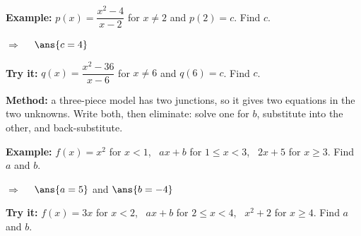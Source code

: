 \documentclass[12pt]{article}
\begin{document}
\begin{examplebox}
\textbf{Example:} \quad $p(x) = \dfrac{x^2-4}{x-2}$ for $x \neq 2$ and
$p(2) = c$. Find $c$.

$\Rightarrow\quad$ $\ans{c = 4}$
\end{examplebox}

\begin{tryitbox}
\textbf{Try it:} \quad $q(x) = \dfrac{x^2-36}{x-6}$ for $x \neq 6$ and
$q(6) = c$. Find $c$.\\[2pt]
\end{tryitbox}


\begin{formulabox}
\textbf{Method:} a three-piece model has two junctions, so it gives two
equations in the two unknowns. Write both, then eliminate: solve one for $b$,
substitute into the other, and back-substitute.
\end{formulabox}

\begin{examplebox}
\textbf{Example:} \quad $f(x) = x^2$ for $x < 1$, \ $ax + b$ for
$1 \le x < 3$, \ $2x + 5$ for $x \ge 3$. Find $a$ and $b$.

$\Rightarrow\quad$ $\ans{a = 5}$ \quad and \quad $\ans{b = -4}$
\end{examplebox}

\begin{tryitbox}
\textbf{Try it:} \quad $f(x) = 3x$ for $x < 2$, \ $ax + b$ for $2 \le x < 4$, \
$x^2 + 2$ for $x \ge 4$. Find $a$ and $b$.\\[2pt]
\end{tryitbox}
\end{document}
